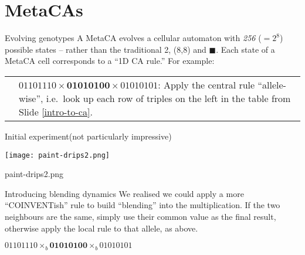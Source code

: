 \part{MetaCAs}
\frame{\partpage}

\begin{frame}{Evolving genotypes}{}
A {MetaCA } evolves a cellular automaton with \emph{{\color{red}2}{\color{LimeGreen}5}{\color{blue}6}} ($=2^8$) possible
states -- rather than the traditional 2, \framebox(8,8){} and $\blacksquare$.
Each state of a MetaCA cell corresponds to a ``1D CA rule.''  For example:\\[.3in]
\begin{tabular}{l@{\hskip -.1in}p{2.5in}}
\begin{fminipage}{1.7in}

\end{fminipage} & 
\vspace*{-.7in}
$01101110\times \mathbf{01010100}\times 01010101$: Apply the central rule ``allele-wise'', i.e.~look up each row of triples on the left in the table
from Slide \ref{intro-to-ca}. 
\end{tabular}
\end{frame}

\begin{frame}{Initial experiment}{(not particularly impressive)}
\begin{center}
\texttt{[image: paint-drips2.png]}

\pause
paint-drips2.png
\end{center}
\end{frame}

\begin{frame}{Introducing blending dynamics}{}
We realised we could apply a more ``COINVENTish'' rule to build
``blending'' into the multiplication.  If the two neighbours are the
same, simply use their common value as the final result, otherwise apply
the local rule to that allele, as above.
\begin{center}
\begin{fminipage}{2.7in}

\end{fminipage} 

$01101110\times_b \mathbf{01010100}\times_b 01010101$ 
\end{center}
\end{frame}

